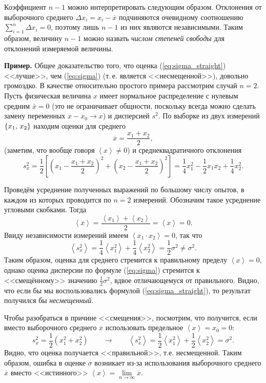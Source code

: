 \documentclass[10pt]{article}
\begin{document}
Коэффициент $n-1$ можно интерпретировать следующим образом. Отклонения
от выборочного среднего $\Delta x_{i}=x_{i}-\overline{x}$ подчиняются
очевидному соотношению $\sum\limits _{i=1}^{n}\Delta x_{i}=0$, поэтому
лишь $n-1$ из них являются независимыми. Таким образом, величину
$n-1$ можно назвать \emph{числом степеней свободы} для отклонений
измеряемой величины.

\textbf{\footnotesize{}Пример.}{\footnotesize{} Общее доказательство
того, что оценка }(\ref{eq:sigma_straight}){\footnotesize{} <<лучше>>,
чем }(\ref{eq:sigma}){\footnotesize{} (т.\,е. является <<несмещенной>>),
довольно громоздко. В качестве относительно простого примера рассмотрим
случай $n=2$. Пусть физическая величина $x$ имеет нормальное распределение
с нулевым средним $\bar{x}=0$ (это не ограничивает общности, поскольку
всегда можно сделать замену переменных $x-x_{0}\to x$) и дисперсией
$s^{2}$. По выборке из двух измерений $\left\{ x_{1},\thinspace x_{2}\right\} $
находим оценки для среднего
\[
\overline{x}=\frac{x_{1}+x_{2}}{2},
\]
(заметим, что вообще говоря $\left\langle x\right\rangle \ne0$) и
среднеквадратичного отклонения 
\[
s_{x}^{2}=\frac{1}{2}\left[\left(x_{1}-\frac{x_{1}+x_{2}}{2}\right)^{2}+\left(x_{2}-\frac{x_{1}+x_{2}}{2}\right)^{2}\right]=\frac{1}{4}x_{1}^{2}-\frac{1}{2}x_{1}x_{2}+\frac{1}{4}x_{2}^{2}.
\]
}{\footnotesize\par}

{\footnotesize{}Проведём усреднение полученных выражений по большому
числу опытов, в каждом из которых проводится по $n=2$ измерений.
Обозначим такое усреднение угловыми скобками. Тогда
\[
\left\langle \overline{x}\right\rangle =\frac{\left\langle x_{1}\right\rangle +\left\langle x_{2}\right\rangle }{2}=\left\langle x\right\rangle =0.
\]
Ввиду независимости измерений имеем $\left\langle x_{1}\cdot x_{2}\right\rangle =0$,
так что
\[
\left\langle s_{x}^{2}\right\rangle =\frac{1}{4}\left\langle x_{1}^{2}\right\rangle +\frac{1}{4}\left\langle x_{2}^{2}\right\rangle =\frac{1}{2}\sigma^{2}\ne\sigma^{2}.
\]
Таким образом, оценка для среднего стремится к правильному пределу
$\left\langle x\right\rangle =0$, однако оценка дисперсии по формуле
(\ref{eq:sigma}) стремится к <<смещённому>>
значению $\frac{1}{2}\sigma^{2}$, вдвое отличающемуся от правильного.
Видно, что если бы мы воспользовались формулой (\ref{eq:sigma_straight}),
то результат получился бы }\emph{\footnotesize{}несмещенный}{\footnotesize{}.}{\footnotesize\par}

{\footnotesize{}Чтобы разобраться в причине <<смещения>>,
посмотрим, что получится, если вместо выборочного среднего $\overline{x}$
использовать предельное $\left\langle x\right\rangle =x_{0}=0$:
\[
s_{x}^{2}=\frac{1}{2}\left(x_{1}^{2}+x_{2}^{2}\right)\qquad\to\qquad\left\langle s_{x}^{2}\right\rangle =\frac{1}{2}\left\langle x_{1}^{2}\right\rangle +\frac{1}{2}\left\langle x_{2}^{2}\right\rangle =\sigma^{2}.
\]
Видно, что оценка получается <<правильной>>,
т.е. несмещенной. Таким образом, ошибка в оценке $\sigma$ возникает
из-за использования выборочного среднего $\overline{x}$ вместо <<истинного>>
$\left\langle x\right\rangle =\lim\limits _{n\to\infty}\overline{x}$.}{\footnotesize\par}
\end{document}
